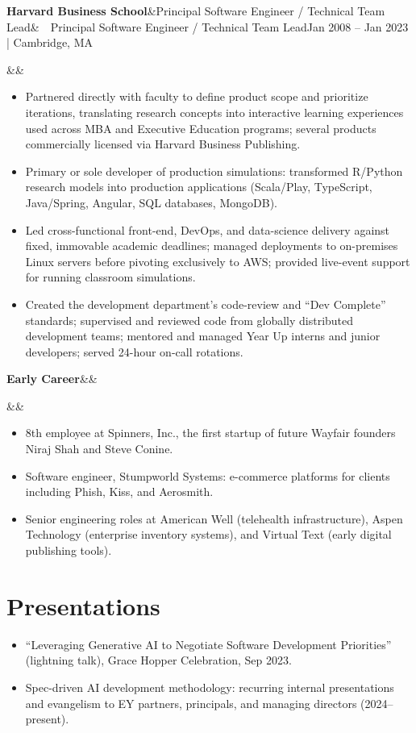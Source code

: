 \documentclass[10pt,letterpaper]{article}
\newcommand{\role}[4]{%
  \vspace{5pt}\textbf{#1}\ifx&#2&\else\ \textbar\ #2\fi \hfill {\small #3}\par
  \ifx&#4&\else{\small\itshape #4}\par\fi
  \vspace{1pt}}
\begin{document}
\role{Harvard Business School}{Principal Software Engineer / Technical Team Lead}{Jan 2008 -- Jan 2023 | Cambridge, MA}{}
\begin{itemize}
  \item Partnered directly with faculty to define product scope and prioritize iterations, translating research concepts into interactive learning experiences used across MBA and Executive Education programs; several products commercially licensed via Harvard Business Publishing.
  \item Primary or sole developer of production simulations: transformed R/Python research models into production applications (Scala/Play, TypeScript, Java/Spring, Angular, SQL databases, MongoDB).
  \item Led cross-functional front-end, DevOps, and data-science delivery against fixed, immovable academic deadlines; managed deployments to on-premises Linux servers before pivoting exclusively to AWS; provided live-event support for running classroom simulations.
  \item Created the development department's code-review and ``Dev Complete'' standards; supervised and reviewed code from globally distributed development teams; mentored and managed Year Up interns and junior developers; served 24-hour on-call rotations.
\end{itemize}

\role{Early Career}{}{}{}
\begin{itemize}
  \item 8th employee at Spinners, Inc., the first startup of future Wayfair founders Niraj Shah and Steve Conine.
  \item Software engineer, Stumpworld Systems: e-commerce platforms for clients including Phish, Kiss, and Aerosmith.
  \item Senior engineering roles at American Well (telehealth infrastructure), Aspen Technology (enterprise inventory systems), and Virtual Text (early digital publishing tools).
\end{itemize}

\section*{Presentations}
\begin{itemize}
  \item ``Leveraging Generative AI to Negotiate Software Development Priorities'' (lightning talk), Grace Hopper Celebration, Sep 2023.
  \item Spec-driven AI development methodology: recurring internal presentations and evangelism to EY partners, principals, and managing directors (2024--present).
\end{itemize}
\end{document}
